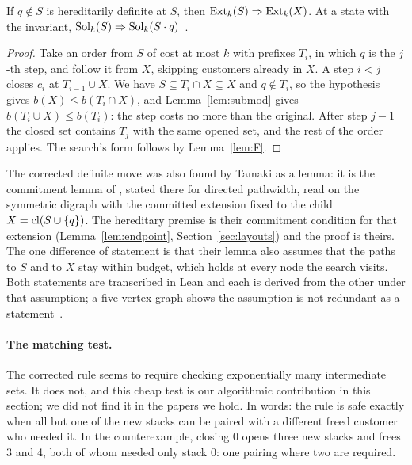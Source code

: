 \begin{theorem}\label{thm:repaired}
If $q\notin S$ is hereditarily definite at $S$, then $\mathrm{Ext}_k(S)\Rightarrow \mathrm{Ext}_k(X)$.
At a state with the invariant, $\mathrm{Sol}_k(S)\Rightarrow\mathrm{Sol}_k(S\cdot q)$~.
\end{theorem}
\begin{proof}
Take an order from $S$ of cost at most $k$ with prefixes $T_i$, in which $q$ is
the $j$-th step, and follow it from $X$, skipping customers already in $X$. A
step $i<j$ closes $c_i$ at $T_{i-1}\cup X$. We have
$S\subseteq T_i\cap X\subseteq X$ and $q\notin T_i$, so the hypothesis gives
$b(X)\le b(T_i\cap X)$, and Lemma~\ref{lem:submod} gives
$b(T_i\cup X)\le b(T_i)$: the step costs no more than the original. After step
$j-1$ the closed set contains $T_j$ with the same opened set, and the rest of
the order applies. The search's form follows by Lemma~\ref{lem:F}.
\end{proof}

The corrected definite move was also found by Tamaki as a lemma: it is the
commitment lemma of \citet[Lemma~1, p.~142]{Kitsunai2016}, stated there for
directed pathwidth, read on the symmetric digraph with the committed extension
fixed to the child $X=\mathrm{cl}(S\cup\{q\})$. The hereditary premise is their
commitment condition for that extension (Lemma~\ref{lem:endpoint},
Section~\ref{sec:layouts}) and the proof is theirs. The one difference of
statement is that their lemma also assumes that the paths to $S$ and to $X$
stay within budget, which holds at every node the search visits. Both
statements are transcribed in Lean and each is derived from the other under
that assumption; a five-vertex graph shows the assumption is not redundant as
a statement~.

\paragraph{The matching test.} The corrected rule seems to require checking
exponentially many intermediate sets. It does not, and this cheap test is our
algorithmic contribution in this section; we did not find it in the papers we
hold. In words: the rule is safe exactly when all but one of the new stacks
can be paired with a different freed customer who needed it. In the
counterexample, closing 0 opens three new stacks and frees 3 and 4, both of
whom needed only stack 0: one pairing where two are required.

